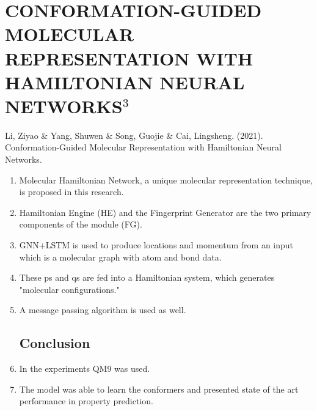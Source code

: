 \documentclass[]{report}
\begin{document}
\section{CONFORMATION-GUIDED MOLECULAR REPRESENTATION WITH HAMILTONIAN NEURAL NETWORKS$^{3}$}
Li, Ziyao \& Yang, Shuwen \& Song, Guojie \& Cai, Lingsheng. (2021). Conformation-Guided Molecular Representation with Hamiltonian Neural Networks. 
\begin{enumerate}
	\subsection{Introduction}
	\item Molecular Hamiltonian Network, a unique molecular representation technique, is proposed in this research.
	\item Hamiltonian Engine (HE) and the Fingerprint Generator are the two primary components of the module (FG).
	\item GNN+LSTM is used to produce locations and momentum from an input which is a molecular graph with atom and bond data.
	\item These ps and qs are fed into a Hamiltonian system, which generates "molecular configurations."
	\item A message passing algorithm is used as well.
	\subsection{Conclusion}
	\item In the experiments QM9 was used.
	\item The model was able to learn the conformers and presented state of the art performance in property prediction.
\end{enumerate}
\end{document}
